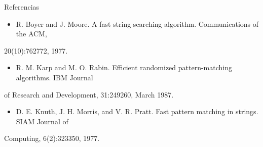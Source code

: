 \documentclass[presentation]{beamer}
\begin{document}
\begin{frame}[label=sec-16]{Referencias}
\begin{itemize}
\item R. Boyer and J. Moore. A fast string searching algorithm. Communications of the ACM,
\end{itemize}
20(10):762772, 1977.
\begin{itemize}
\item R. M. Karp and M. O. Rabin. Efficient randomized pattern-matching algorithms. IBM Journal
\end{itemize}
of Research and Development, 31:249260, March 1987.
\begin{itemize}
\item D. E. Knuth, J. H. Morris, and V. R. Pratt. Fast pattern matching in strings. SIAM Journal of
\end{itemize}
Computing, 6(2):323350, 1977.
\end{frame}
\end{document}
